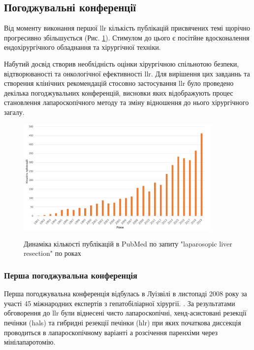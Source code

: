 \begin{refsection}
\subsection{Погоджувальні конференції}

Від моменту виконання першої \acrshort{llr} кількість публікацій присвячених темі щорічно прогресивно збільшується (Рис. \ref{fig:PubMed_publications}). Стимулом до цього є посітйне вдосконалення ендохірургічного обладнання та хірургічної техніки.

Набутий досвід створив необхідність оцінки хірургічною спільнотою безпеки, відтворюваності та онкологічної ефективності \acrshort{llr}. Для вирішення цих завданнь та створення клінічних рекомендацій стосовно застосування \acrshort{llr} було  проведено декілька погоджувальних конференцій, висновки яких відображують процес становлення лапароскопічного методу та зміну відношення до нього хірургічного загалу. 

\begin{figure}[htbp]
\caption{Динаміка кількості публікацій в PubMed по запиту "laparosopic liver resection" по роках \cite{Hashizume1995}}
\centering
\includegraphics[width=0.9\textwidth]{Illustrations/Chapter_01/PubMed_publications.jpg}
\label{fig:PubMed_publications}
\end{figure}

\subsubsection{Перша погоджувальна конференція} 

Перша погоджувальна конференція відбулась в Луізвілі в листопаді 2008 року за участі 45 міжнародних експертів з гепатобіліарної хірургії. \cite{Buell2009}. За результатами обговорення до  \acrshort{llr} були віднесені чисто лапароскопічні, хенд-асистовані резекції печінки (\acrshort{hals}) та гибридні резекції печінки (\acrshort{hlr}) при яких початкова диссекція проводиться в лапароскопічному варіанті а розсічення паренхіми через мінілапаротомію. 


\end{refsection}
